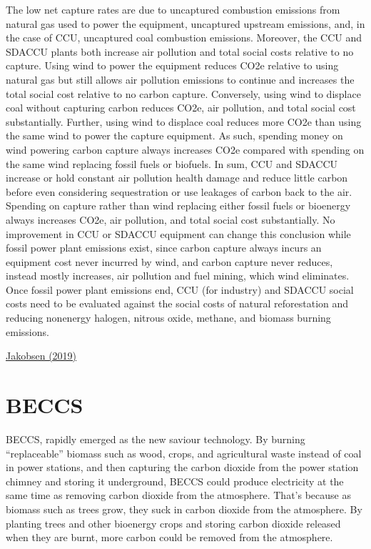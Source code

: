 \documentclass[
]{book}
\begin{document}
The low net capture rates are due to uncaptured combustion emissions from natural gas used to power the equipment, uncaptured upstream emissions, and, in the case of CCU, uncaptured coal combustion emissions. Moreover, the CCU and SDACCU plants both increase air pollution and total social costs relative to no capture. Using wind to power the equipment reduces CO2e relative to using natural gas but still allows air pollution emissions to continue and increases the total social cost relative to no carbon capture. Conversely, using wind to displace coal without capturing carbon reduces CO2e, air pollution, and total social cost substantially. Further, using wind to displace coal reduces more CO2e than using the same wind to power the capture equipment. As such, spending money on wind powering carbon capture always increases CO2e compared with spending on the same wind replacing fossil fuels or biofuels. In sum, CCU and SDACCU increase or hold constant air pollution health damage and reduce little carbon before even considering sequestration or use leakages of carbon back to the air. Spending on capture rather than wind replacing either fossil fuels or bioenergy always increases CO2e, air pollution, and total social cost substantially. No improvement in CCU or SDACCU equipment can change this conclusion while fossil power plant emissions exist, since carbon capture always incurs an equipment cost never incurred by wind, and carbon capture never reduces, instead mostly increases, air pollution and fuel mining, which wind eliminates. Once fossil power plant emissions end, CCU (for industry) and SDACCU social costs need to be evaluated against the social costs of natural reforestation and reducing nonenergy halogen, nitrous oxide, methane, and biomass burning emissions.

\href{https://research.american.edu/carbonremoval/2019/11/13/jacobson-mark-2019-why-carbon-capture-and-direct-air-capture-cause-more-damage-than-good-to-climate-and-health/}{Jakobsen (2019)}

\hypertarget{beccs}{%
\section{BECCS}\label{beccs}}

BECCS, rapidly emerged as the new saviour technology. By burning ``replaceable'' biomass such as wood, crops, and agricultural waste instead of coal in power stations, and then capturing the carbon dioxide from the power station chimney and storing it underground, BECCS could produce electricity at the same time as removing carbon dioxide from the atmosphere. That's because as biomass such as trees grow, they suck in carbon dioxide from the atmosphere. By planting trees and other bioenergy crops and storing carbon dioxide released when they are burnt, more carbon could be removed from the atmosphere.
\end{document}
